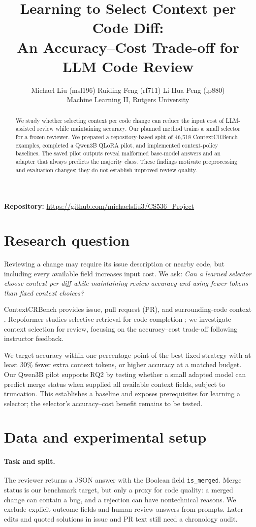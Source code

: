 \documentclass{article}
\title{Learning to Select Context per Code Diff:\\An Accuracy--Cost Trade-off for LLM Code Review}
\author{Michael Liu (msl196) \quad Ruiding Feng (rf711) \quad Li-Hua Peng (lp880)\\
Machine Learning II, Rutgers University}
\begin{document}
\nolinenumbers
\maketitle
\thispagestyle{plain}
\begin{abstract}
We study whether selecting context per code change can reduce the input cost of LLM-assisted review while maintaining accuracy. Our planned method trains a small selector for a frozen reviewer. We prepared a repository-based split of 46,518 ContextCRBench examples, completed a Qwen3B QLoRA pilot, and implemented context-policy baselines. The saved pilot outputs reveal malformed base-model answers and an adapter that always predicts the majority class. These findings motivate preprocessing and evaluation changes; they do not establish improved review quality.
\end{abstract}
\noindent\textbf{Repository:} \url{https://github.com/michaelsliu3/CS536_Project}

\section{Research question}
Reviewing a change may require its issue description or nearby code, but including every available field increases input cost. We ask: \emph{Can a learned selector choose context per diff while maintaining review accuracy and using fewer tokens than fixed context choices?}

ContextCRBench provides issue, pull request (PR), and surrounding-code context \citep{hu2025}. Repoformer studies selective retrieval for code completion \citep{wu2024}; we investigate context selection for review, focusing on the accuracy--cost trade-off following instructor feedback.

We target accuracy within one percentage point of the best fixed strategy with at least 30\% fewer extra context tokens, or higher accuracy at a matched budget. Our Qwen3B pilot supports RQ2 by testing whether a small adapted model can predict merge status when supplied all available context fields, subject to truncation. This establishes a baseline and exposes prerequisites for learning a selector; the selector's accuracy--cost benefit remains to be tested.

\section{Data and experimental setup}
\paragraph{Task and split.}
The reviewer returns a JSON answer with the Boolean field \texttt{is\_merged}. Merge status is our benchmark target, but only a proxy for code quality: a merged change can contain a bug, and a rejection can have nontechnical reasons. We exclude explicit outcome fields and human review answers from prompts. Later edits and quoted solutions in issue and PR text still need a chronology audit.
\end{document}
